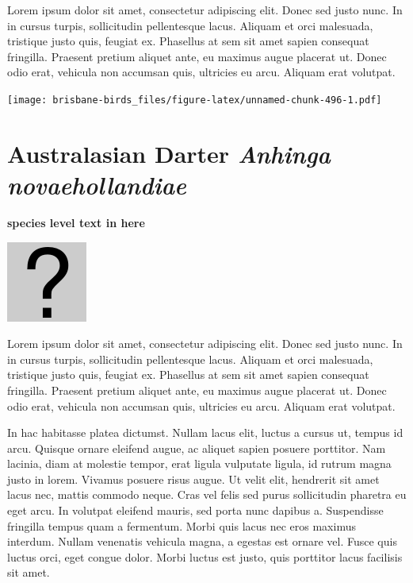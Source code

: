 \documentclass[]{book}
\let\origfigure\figure
\let\endorigfigure\endfigure
\renewenvironment{figure}[1][2] {
  \expandafter\origfigure\expandafter[H]
} {
  \endorigfigure
}
\begin{document}
Lorem ipsum dolor sit amet, consectetur adipiscing elit. Donec sed justo
nunc. In in cursus turpis, sollicitudin pellentesque lacus. Aliquam et
orci malesuada, tristique justo quis, feugiat ex. Phasellus at sem sit
amet sapien consequat fringilla. Praesent pretium aliquet ante, eu
maximus augue placerat ut. Donec odio erat, vehicula non accumsan quis,
ultricies eu arcu. Aliquam erat volutpat.

\texttt{[image: brisbane-birds\_files/figure-latex/unnamed-chunk-496-1.pdf]}

\section{\texorpdfstring{Australasian Darter \emph{Anhinga
novaehollandiae}}{Australasian Darter Anhinga novaehollandiae}}\label{australasian-darter-anhinga-novaehollandiae}

\textbf{species level text in here}

\begin{figure}
\centering
\includegraphics{assets/missing.png}
\caption{No image for species}
\end{figure}

Lorem ipsum dolor sit amet, consectetur adipiscing elit. Donec sed justo
nunc. In in cursus turpis, sollicitudin pellentesque lacus. Aliquam et
orci malesuada, tristique justo quis, feugiat ex. Phasellus at sem sit
amet sapien consequat fringilla. Praesent pretium aliquet ante, eu
maximus augue placerat ut. Donec odio erat, vehicula non accumsan quis,
ultricies eu arcu. Aliquam erat volutpat.

In hac habitasse platea dictumst. Nullam lacus elit, luctus a cursus ut,
tempus id arcu. Quisque ornare eleifend augue, ac aliquet sapien posuere
porttitor. Nam lacinia, diam at molestie tempor, erat ligula vulputate
ligula, id rutrum magna justo in lorem. Vivamus posuere risus augue. Ut
velit elit, hendrerit sit amet lacus nec, mattis commodo neque. Cras vel
felis sed purus sollicitudin pharetra eu eget arcu. In volutpat eleifend
mauris, sed porta nunc dapibus a. Suspendisse fringilla tempus quam a
fermentum. Morbi quis lacus nec eros maximus interdum. Nullam venenatis
vehicula magna, a egestas est ornare vel. Fusce quis luctus orci, eget
congue dolor. Morbi luctus est justo, quis porttitor lacus facilisis sit
amet.
\end{document}
